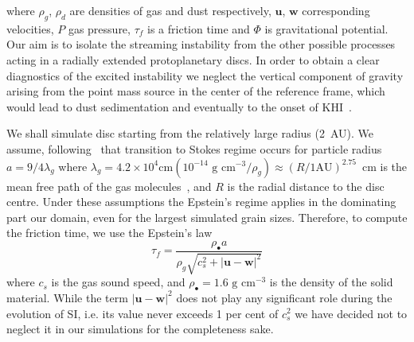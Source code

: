 \noindent where $\rho_g$, $\rho_d$ are densities of gas and dust respectively,
$\mathbf{u}$, $\mathbf{w}$ corresponding velocities, $P$ gas pressure, $\tau_f$
is a friction time and $\Phi$ is gravitational potential. Our aim is to isolate
the streaming instability from the other possible processes acting in a radially
extended protoplanetary discs. In order to obtain a clear diagnostics of the
excited instability we neglect the vertical component of gravity arising from the
point mass source in the center of the reference frame, which would lead to dust
sedimentation and eventually to the onset of KHI~\citep{JHK06}.

We shall simulate disc starting from the relatively large radius (2~AU).  We
assume, following~\cite{CD93} that transition to Stokes regime occurs for
particle radius $a = 9/4\lambda_g$ where  $\lambda_g = 4.2\times 10^4\textrm{
cm} (10^{-14}\textrm{ g cm}^{-3}/\rho_g) \approx (R/1 \textrm{AU})^{2.75}$~cm is
the mean free path of the gas molecules~\citep{W77,BT09},  and $R$ is the radial
distance to the disc centre.  Under these assumptions the Epstein's regime
applies in the dominating part our domain, even for the largest simulated grain
sizes.  Therefore, to compute the friction time, we use the Epstein's law
%
\begin{equation}
   \tau_f = \frac{\rho_\bullet a} 
      {\rho_g \sqrt{c_s^2 + |\mathbf{u} - \mathbf{w}|^2 }}
   \label{eq:tauf} 
\end{equation}
%
where $c_s$ is the gas sound speed, and $\rho_\bullet = 1.6\textrm{ g cm}^{-3}$
is the density of the solid material.
While the term $|\mathbf{u}-\mathbf{w}|^2$ does not play any significant
role during the evolution of SI, i.e. its value never exceeds 1 per cent of
$c_s^2$ we have decided not to neglect it in our simulations for the
completeness sake.

